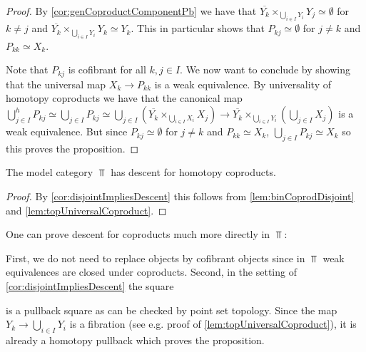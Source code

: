 \begin{corollary}
\begin{proof}
        By \cref{cor:genCoproductComponentPb} we have that $\overline{Y_k}\times_{\bigcup\limits_{i\in I}Y_i} Y_j\simeq\emptyset$ for $k\neq j$ and $\overline{Y_k}\times_{\bigcup\limits_{i\in I}Y_i} Y_k\simeq Y_k$. %
        This in particular shows that $P_{kj}\simeq\emptyset$ for $j\neq k$ and $P_{kk}\simeq X_k$. %
        
        Note that $P_{kj}$ is cofibrant for all $k,j\in I$. 
        We now want to conclude by showing that the universal map $X_k\to P_{kk}$ is a weak equivalence.
        By universality of homotopy coproducts we have that the canonical map $\bigcup\limits_{j\in I}^hP_{kj}\simeq\bigcup\limits_{j\in I}P_{kj}\simeq\bigcup\limits_{j\in I} \left(\overline{Y_k}\times_{\bigcup\limits_{i\in I}X_i}X_j\right)\to\overline{Y_k}\times_{\bigcup\limits_{i\in I}Y_i}\left(\bigcup\limits_{j\in I}X_j\right)$ is a weak equivalence.
        But since $P_{kj}\simeq\emptyset$ for $j\neq k$ and $P_{kk}\simeq X_k$, $\bigcup\limits_{j\in I}P_{kj}\simeq X_k$ so this proves the proposition.
    \end{proof}
\end{corollary}
\begin{corollary}\label{cor:topDescentCoproduct}
    The model category $\Top$ has descent for homotopy coproducts.
    \begin{proof}
        By \cref{cor:disjointImpliesDescent} this follows from \cref{lem:binCoprodDisjoint} and \cref{lem:topUniversalCoproduct}.
    \end{proof}
\end{corollary}
\begin{remark}
    One can prove descent for coproducts much more directly in $\Top$:

    First, we do not need to replace objects by cofibrant objects since in $\Top$ weak equivalences are closed under coproducts.
    Second, in the setting of \cref{cor:disjointImpliesDescent} the square
    \begin{center}
    \end{center}
    is a pullback square as can be checked by point set topology.
    Since the map $Y_k\to\bigcup\limits_{i\in I}Y_i$ is a fibration (see e.g. proof of \cref{lem:topUniversalCoproduct}), it is already a homotopy pullback which proves the proposition.
\end{remark}
